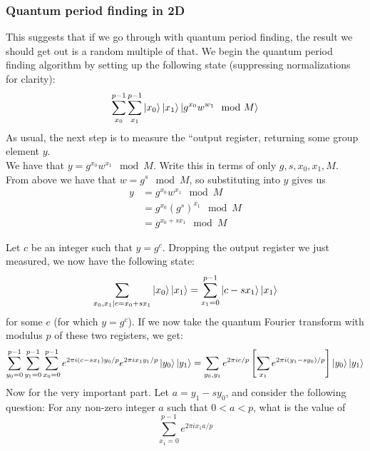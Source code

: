 \subsubsection{Quantum period finding in 2D}
This suggests that if we go through with quantum period finding, the result we should get out is a random multiple of that. We begin the quantum period finding algorithm by setting up the following state (suppressing normalizations for clarity):
\begin{equation}
    \sum_{x_0}^{p-1}\sum_{x_1}^{p-1} \ket{x_0}\ket{x_1} \ket{g^{x_0}w^{w_1} \mod M }
\end{equation}
As usual, the next step is to measure the ``output register, returning some group element $y$. \\

We have that $y = g^{x_0}w^{x_1}\mod M$. Write this in terms of only $g,s,x_0,x_1,M$. \\

From above we have that $w = g^s \mod M$, so substituting into $y$ gives us
\begin{align}
    y &= g^{x_0}w^{x_1}\mod M \\
    &= g^{x_0}(g^s)^{x_1} \mod M \\
    &= g^{x_0 + sx_1} \mod M
\end{align}
    
Let $c$ be an integer such that $y = g^c$. Dropping the output register we just measured, we now have the following state:
\begin{equation}
    \sum_{x_0,x_1|c=x_0 + sx_1} \ket{x_0}\ket{x_1} = \sum_{x_1=0}^{p-1} \ket{c-sx_1} \ket{x_1}
\end{equation}
for some $c$ (for which $y = g^c$). If we now take the quantum Fourier transform with modulus $p$ of these two registers, we get: 
\begin{equation}
    \sum_{y_0 =0}^{p-1}\sum_{y_1 =0}^{p-1}\sum_{x_0 =0}^{p-1} e^{2\pi i (c-sx_1)y_0/p}e^{2 \pi i x_1 y_1 / p} \ket{y_0} \ket{y_1} = \sum_{y_0,y_1} e^{2 \pi i c/p} \left[\sum_{x_1}e^{2\pi i (y_1 - sy_0)/p}\right] \ket{y_0}\ket{y_1}
\end{equation}
Now for the very important part. Let $a = y_1 - sy_0$, and consider the following question: For any non-zero integer $a$ such that $0 < a < p$, what is the value of 
\begin{equation}
    \sum_{x_1=0}^{p-1} e^{2\pi i x_1 a/ p}
\end{equation}

\noindent{}


